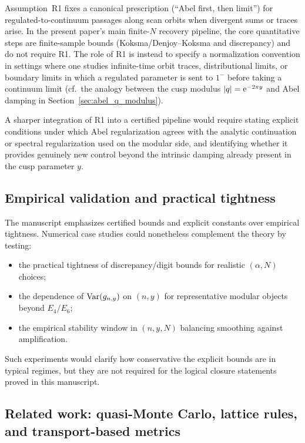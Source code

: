 Assumption~R1 fixes a canonical prescription (``Abel first, then limit'') for regulated-to-continuum passages along scan orbits when divergent sums or traces arise.
In the present paper's main finite-$N$ recovery pipeline, the core quantitative steps are finite-sample bounds (Koksma/Denjoy--Koksma and discrepancy) and do not require R1.
The role of R1 is instead to specify a normalization convention in settings where one studies infinite-time orbit traces, distributional limits, or boundary limits in which a regulated parameter is sent to $1^-$ before taking a continuum limit (cf.\ the analogy between the cusp modulus $|q|=\mathrm{e}^{-2\pi y}$ and Abel damping in Section~\ref{sec:abel_q_modulus}).
\par
A sharper integration of R1 into a certified pipeline would require stating explicit conditions under which Abel regularization agrees with the analytic continuation or spectral regularization used on the modular side, and identifying whether it provides genuinely new control beyond the intrinsic damping already present in the cusp parameter $y$.

\subsection{Empirical validation and practical tightness}
\label{app:limitations_empirical}

The manuscript emphasizes certified bounds and explicit constants over empirical tightness. Numerical case studies could nonetheless complement the theory by testing:
\begin{itemize}
\item the practical tightness of discrepancy/digit bounds for realistic $(\alpha,N)$ choices;
\item the dependence of $\mathrm{Var}(g_{n,y})$ on $(n,y)$ for representative modular objects beyond $E_4/E_6$;
\item the empirical stability window in $(n,y,N)$ balancing smoothing against amplification.
\end{itemize}
Such experiments would clarify how conservative the explicit bounds are in typical regimes, but they are not required for the logical closure statements proved in this manuscript.

\subsection{Related work: quasi-Monte Carlo, lattice rules, and transport-based metrics}
\label{app:limitations_related_work}

